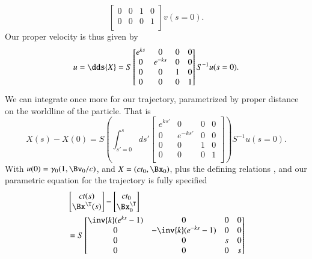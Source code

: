 {\begin{equation}
\begin{bmatrix}
0 & 0 & 1 & 0 \\
0 & 0 & 0 & 1 \\
\end{bmatrix} v(s=0).
\end{equation}
%
Our proper velocity is thus given by
%
\begin{equation}\label{eqn:relElectroDynProblemSet2:870}
u = \dds{X} = S
\begin{bmatrix}
e^{ks} & 0 & 0 & 0 \\
0 & e^{-ks} & 0 & 0 \\
0 & 0 & 1 & 0 \\
0 & 0 & 0 & 1 \\
\end{bmatrix} S^{-1} u(s=0).
\end{equation}
%
We can integrate once more for our trajectory, parametrized by proper distance on the worldline of the particle.  That is
%
\begin{equation}\label{eqn:relElectroDynProblemSet2:890}
X(s) - X(0)
= S \left( \int_{s'=0}^s
ds'
\begin{bmatrix}
e^{ks'} & 0 & 0 & 0 \\
0 & e^{-ks'} & 0 & 0 \\
0 & 0 & 1 & 0 \\
0 & 0 & 0 & 1 \\
\end{bmatrix} \right) S^{-1} u(s=0).
\end{equation}
%
With \(u(0) = \gamma_0 (1, \Bv_0/c)\), and \(X = (c t_0, \Bx_0)\), plus the defining relations , and  our parametric equation for the trajectory is fully specified
%
\begin{equation}\label{eqn:relElectroDynProblemSet2:910}
\begin{aligned}
&\begin{bmatrix}
c t(s) \\
\Bx^\T(s)
\end{bmatrix}
-
\begin{bmatrix}
c t_0 \\
\Bx_0^\T
\end{bmatrix} \\
&= S
\begin{bmatrix}
\inv{k}(e^{ks} -1) & 0 & 0 & 0 \\
0 & -\inv{k}(e^{-ks} -1) & 0 & 0 \\
0 & 0 & s & 0 \\
0 & 0 & 0 & s \\

\end{bmatrix}
\end{aligned}
\end{equation}}
